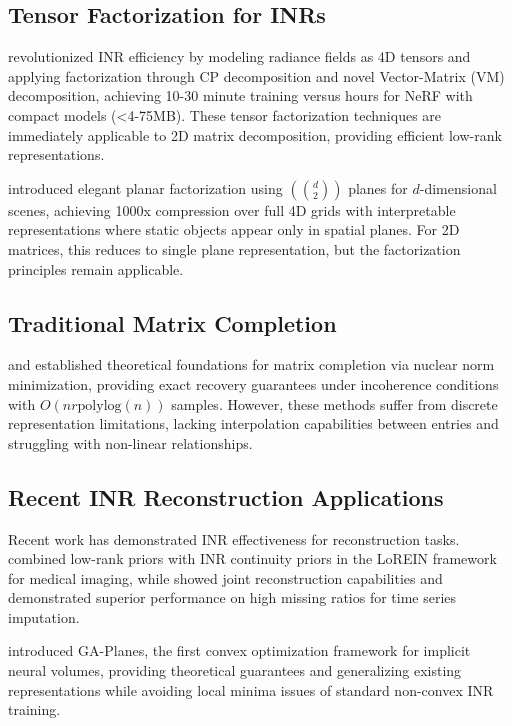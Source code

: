 \documentclass{article}
\begin{document}
\subsection{Tensor Factorization for INRs}

\citet{chen2022tensorf} revolutionized INR efficiency by modeling radiance fields as 4D tensors and applying factorization through CP decomposition and novel Vector-Matrix (VM) decomposition, achieving 10-30 minute training versus hours for NeRF with compact models (<4-75MB). These tensor factorization techniques are immediately applicable to 2D matrix decomposition, providing efficient low-rank representations.

\citet{fridovich2023kplanes} introduced elegant planar factorization using $(d \choose 2)$ planes for $d$-dimensional scenes, achieving 1000x compression over full 4D grids with interpretable representations where static objects appear only in spatial planes. For 2D matrices, this reduces to single plane representation, but the factorization principles remain applicable.

\subsection{Traditional Matrix Completion}

\citet{candes2009matrix} and \citet{recht2011simpler} established theoretical foundations for matrix completion via nuclear norm minimization, providing exact recovery guarantees under incoherence conditions with $O(nr \text{polylog}(n))$ samples. However, these methods suffer from discrete representation limitations, lacking interpolation capabilities between entries and struggling with non-linear relationships.

\subsection{Recent INR Reconstruction Applications}

Recent work has demonstrated INR effectiveness for reconstruction tasks. \citet{zhang2025lorein} combined low-rank priors with INR continuity priors in the LoREIN framework for medical imaging, while \citet{shi2024inr} showed joint reconstruction capabilities and \citet{li2025imputeinr} demonstrated superior performance on high missing ratios for time series imputation.

\citet{sivgin2024gaplanes} introduced GA-Planes, the first convex optimization framework for implicit neural volumes, providing theoretical guarantees and generalizing existing representations while avoiding local minima issues of standard non-convex INR training.
\end{document}
